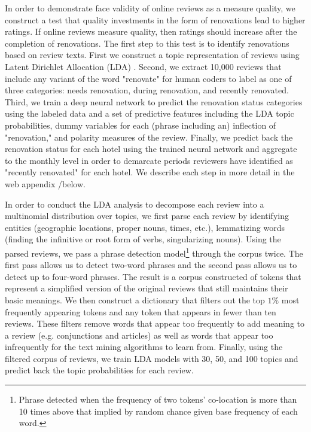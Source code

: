 \documentclass[mksc,blindrev]{informs3} %
\begin{document}
In order to demonstrate face validity of online reviews as a measure quality, we construct a test that quality investments in the form of renovations lead to higher ratings. If online reviews measure quality, then ratings should increase after the completion of renovations. The first step to this test is to identify renovations based on review texts. First we construct a topic representation of reviews using Latent Dirichlet Allocation (LDA) \citep{blei2003latent, wang2018and}. Second, we extract 10,000 reviews that include any variant of the word "renovate" for human coders to label as one of three categories: needs renovation, during renovation, and recently renovated. Third, we train a deep neural network to predict the renovation status categories using the labeled data and a set of predictive features including the LDA topic probabilities, dummy variables for each (phrase including an) inflection of "renovation," and polarity measures of the review. Finally, we predict back the renovation status for each hotel using the trained neural network and aggregate to the monthly level in order to demarcate periods reviewers have identified as "recently renovated" for each hotel. We describe each step in more detail in the web appendix /below. %

In order to conduct the LDA analysis to decompose each review into a multinomial distribution over topics, we first parse each review by identifying entities (geographic locations, proper nouns, times, etc.), lemmatizing words (finding the infinitive or root form of verbs, singularizing nouns). Using the parsed reviews, we pass a phrase detection model\footnote{Phrase detected when the frequency of two tokens' co-location is more than 10 times above that implied by random chance given base frequency of each word.} through the corpus twice. The first pass allows us to detect two-word phrases and the second pass allows us to detect up to four-word phrases. The result is a corpus constructed of tokens that represent a simplified version of the original reviews that still maintains their basic meanings. We then construct a dictionary that filters out the top $1\%$ most frequently appearing tokens and any token that appears in fewer than ten reviews. These filters remove words that appear too frequently to add meaning to a review (e.g. conjunctions and articles) as well as words that appear too infrequently for the text mining algorithms to learn from. Finally, using the filtered corpus of reviews, we train LDA models with 30, 50, and 100 topics and predict back the topic probabilities for each review. 
\end{document}

